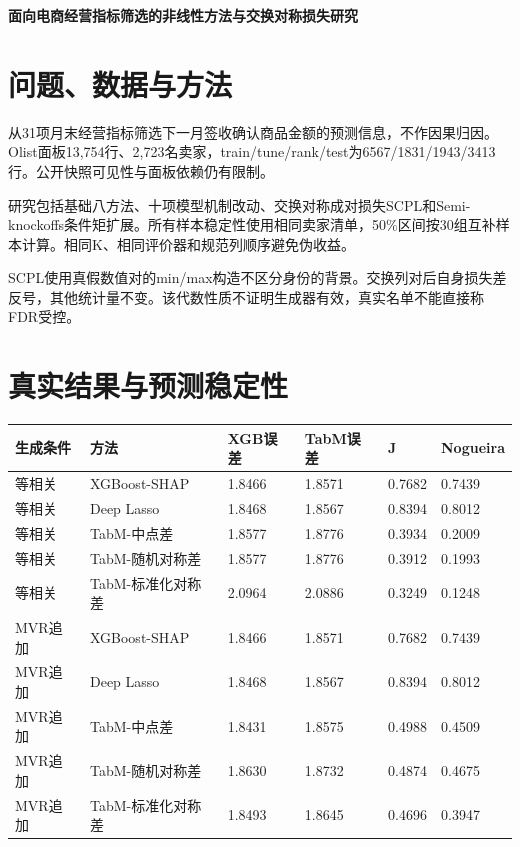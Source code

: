 \documentclass[UTF8,11pt,a4paper]{ctexart}
\begin{document}
\begin{center}\large\bfseries 面向电商经营指标筛选的非线性方法与交换对称损失研究\end{center}\section{问题、数据与方法}

从31项月末经营指标筛选下一月签收确认商品金额的预测信息，不作因果归因。Olist面板13,754行、2,723名卖家，train/tune/rank/test为6567/1831/1943/3413行。公开快照可见性与面板依赖仍有限制。

研究包括基础八方法、十项模型机制改动、交换对称成对损失SCPL和Semi-knockoffs条件矩扩展。所有样本稳定性使用相同卖家清单，50\%区间按30组互补样本计算。相同K、相同评价器和规范列顺序避免伪收益。

SCPL使用真假数值对的min/max构造不区分身份的背景。交换列对后自身损失差反号，其他统计量不变。该代数性质不证明生成器有效，真实名单不能直接称FDR受控。

\newpage

\section{真实结果与预测稳定性}

{\def\LTcaptype{none} %
{
\footnotesize
\begin{longtable}[]{@{}llllll@{}}
\toprule\noalign{}
生成条件 & 方法 & XGB误差 & TabM误差 & J & Nogueira \\
\midrule\noalign{}
\endhead
\bottomrule\noalign{}
\endlastfoot
等相关 & XGBoost-SHAP & 1.8466 & 1.8571 & 0.7682 & 0.7439 \\
等相关 & Deep Lasso & 1.8468 & 1.8567 & 0.8394 & 0.8012 \\
等相关 & TabM-中点差 & 1.8577 & 1.8776 & 0.3934 & 0.2009 \\
等相关 & TabM-随机对称差 & 1.8577 & 1.8776 & 0.3912 & 0.1993 \\
等相关 & TabM-标准化对称差 & 2.0964 & 2.0886 & 0.3249 & 0.1248 \\
MVR追加 & XGBoost-SHAP & 1.8466 & 1.8571 & 0.7682 & 0.7439 \\
MVR追加 & Deep Lasso & 1.8468 & 1.8567 & 0.8394 & 0.8012 \\
MVR追加 & TabM-中点差 & 1.8431 & 1.8575 & 0.4988 & 0.4509 \\
MVR追加 & TabM-随机对称差 & 1.8630 & 1.8732 & 0.4874 & 0.4675 \\
MVR追加 & TabM-标准化对称差 & 1.8493 & 1.8645 & 0.4696 & 0.3947 \\
\end{longtable}
}
}
\end{document}
